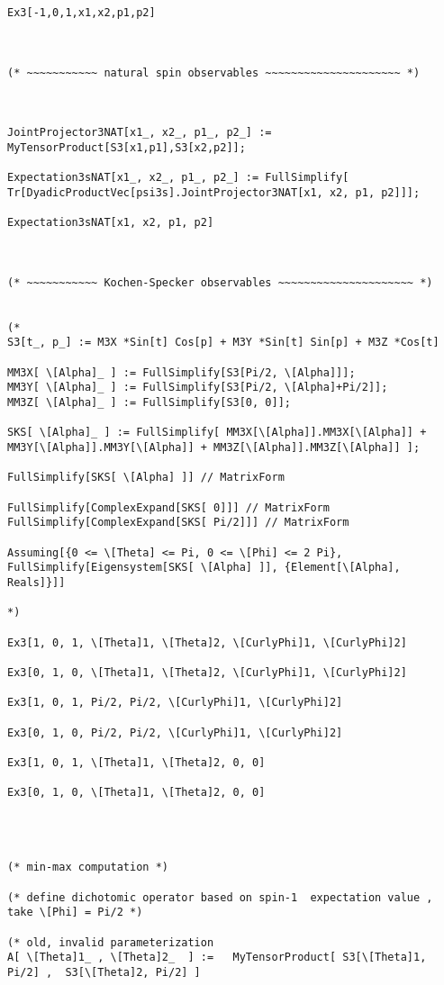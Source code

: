 \documentclass[%
 showpacs,
 showkeys,
 preprintnumbers,
 amsmath,amssymb,
 aps,
  pra,
  longbibliography,
 floatfix,
 ]{revtex4-1}
\begin{document}
{\begin{lstlisting}[backgroundcolor=\color{yellow!10},framerule=0pt,breaklines=true, frame=tb]
Ex3[-1,0,1,x1,x2,p1,p2]



(* ~~~~~~~~~~~ natural spin observables ~~~~~~~~~~~~~~~~~~~~~ *)



JointProjector3NAT[x1_, x2_, p1_, p2_] :=  MyTensorProduct[S3[x1,p1],S3[x2,p2]];

Expectation3sNAT[x1_, x2_, p1_, p2_] := FullSimplify[ Tr[DyadicProductVec[psi3s].JointProjector3NAT[x1, x2, p1, p2]]];

Expectation3sNAT[x1, x2, p1, p2]



(* ~~~~~~~~~~~ Kochen-Specker observables ~~~~~~~~~~~~~~~~~~~~~ *)


(*
S3[t_, p_] := M3X *Sin[t] Cos[p] + M3Y *Sin[t] Sin[p] + M3Z *Cos[t]

MM3X[ \[Alpha]_ ] := FullSimplify[S3[Pi/2, \[Alpha]]];
MM3Y[ \[Alpha]_ ] := FullSimplify[S3[Pi/2, \[Alpha]+Pi/2]];
MM3Z[ \[Alpha]_ ] := FullSimplify[S3[0, 0]];

SKS[ \[Alpha]_ ] := FullSimplify[ MM3X[\[Alpha]].MM3X[\[Alpha]] + MM3Y[\[Alpha]].MM3Y[\[Alpha]] + MM3Z[\[Alpha]].MM3Z[\[Alpha]] ];

FullSimplify[SKS[ \[Alpha] ]] // MatrixForm

FullSimplify[ComplexExpand[SKS[ 0]]] // MatrixForm
FullSimplify[ComplexExpand[SKS[ Pi/2]]] // MatrixForm

Assuming[{0 <= \[Theta] <= Pi, 0 <= \[Phi] <= 2 Pi}, FullSimplify[Eigensystem[SKS[ \[Alpha] ]], {Element[\[Alpha], Reals]}]]

*)

Ex3[1, 0, 1, \[Theta]1, \[Theta]2, \[CurlyPhi]1, \[CurlyPhi]2]

Ex3[0, 1, 0, \[Theta]1, \[Theta]2, \[CurlyPhi]1, \[CurlyPhi]2]

Ex3[1, 0, 1, Pi/2, Pi/2, \[CurlyPhi]1, \[CurlyPhi]2]

Ex3[0, 1, 0, Pi/2, Pi/2, \[CurlyPhi]1, \[CurlyPhi]2]

Ex3[1, 0, 1, \[Theta]1, \[Theta]2, 0, 0]

Ex3[0, 1, 0, \[Theta]1, \[Theta]2, 0, 0]




(* min-max computation *)

(* define dichotomic operator based on spin-1  expectation value , take \[Phi] = Pi/2 *)

(* old, invalid parameterization
A[ \[Theta]1_ , \[Theta]2_  ] :=   MyTensorProduct[ S3[\[Theta]1, Pi/2] ,  S3[\[Theta]2, Pi/2] ]


\end{lstlisting}}
\end{document}
